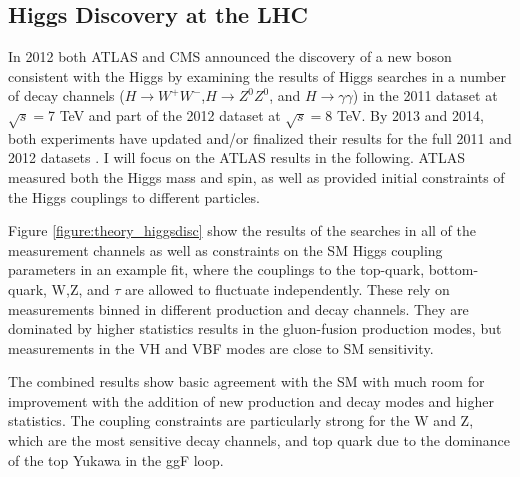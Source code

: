 \subsection{Higgs Discovery at the LHC}

In 2012 both ATLAS and CMS announced the discovery of a new boson consistent
with the Higgs by examining the results of Higgs searches in a number of decay
channels ($H\rightarrow W^+W^-$,$H\rightarrow Z^0Z^0$, and
    $H\rightarrow\gamma\gamma$) in the 2011 dataset at $\sqrt{s}=$7 TeV and
part of the 2012 dataset at $\sqrt{s}=$8 TeV. By 2013 and 2014, both
experiments have updated and/or finalized their results for the full 2011 and
2012 datasets \cite{ATLAS-CONF-2014-009,CMS-PAS-HIG-14-009}. I will focus on the ATLAS results in the following. 
ATLAS measured both the Higgs mass\cite{Aad:2014aba} and spin\cite{tagkey2013120}, as well as 
provided initial constraints of the Higgs couplings to different particles. 

Figure \ref{figure:theory_higgsdisc} show the results of the searches in all of the
measurement channels as well as constraints on the SM Higgs coupling parameters in 
an example fit, where the couplings to the top-quark, bottom-quark, W,Z, and $\tau$
are allowed to fluctuate independently. These rely on measurements binned in different
production and decay channels. They are dominated by higher statistics results in the 
gluon-fusion production modes, but measurements in the VH and VBF modes are close to 
SM sensitivity. 

The combined results show basic agreement with the SM with much room for improvement
with the addition of new production and decay modes and higher statistics. The 
coupling constraints are particularly strong for the W and Z, which are
the most sensitive decay channels, and top quark due to the dominance of the
top Yukawa in the ggF loop. 


